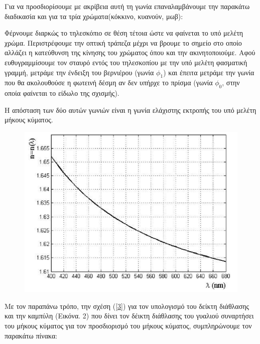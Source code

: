 \documentclass[a4paper]{article}
\begin{document}
Για να προσδιορίσουμε με ακρίβεια αυτή τη γωνία επαναλαμβάνουμε την παρακάτω διαδικασία και για τα τρία χρώματα(κόκκινο, κυανούν, μωβ): 




Φέρνουμε διαρκώς το τηλεσκόπιο σε θέση τέτοια ώστε να φαίνεται το υπό μελέτη χρώμα. Περιστρέφουμε την οπτική τράπεζα μέχρι να βρουμε το σημείο στο οποίο αλλάζει η κατεύθυνση της κίνησης του χρώματος όπου και την ακινητοποιούμε. Αφού ευθυγραμμίσουμε τον σταυρό εντός του τηλεσκοπίου με την υπό μελέτη φασματική γραμμή, μετράμε την ένδειξη του βερνιέρου (γωνία $\phi_1 $) και έπειτα μετράμε την γωνία που θα ακολουθούσε η φωτεινή δέσμη αν δεν υπήρχε το πρίσμα (γωνία $\phi_0$, στην οποία φαίνεται το είδωλο της σχισμής).

Η απόσταση των δύο αυτών γωνιών είναι η γωνία ελάχιστης εκτροπής του υπό μελέτη μήκους κύματος.
 
\begin{figure}[h!]\label{fig2}
\centering  
\caption{ }
\includegraphics[scale=0.35]{n.png}
\end{figure}
Με τον παραπάνω τρόπο, την σχέση (\ref{3}) για τον υπολογισμό του δείκτη διάθλασης και την καμπύλη (Εικόνα. 2) που δίνει τον δέικτη διάθλασης του γυαλιού συναρτήσει του μήκους κύματος για τον προσδιορισμό του μήκους κύματος, συμπληρώνουμε τον παρακάτω πίνακα: 
\newline
\end{document}
